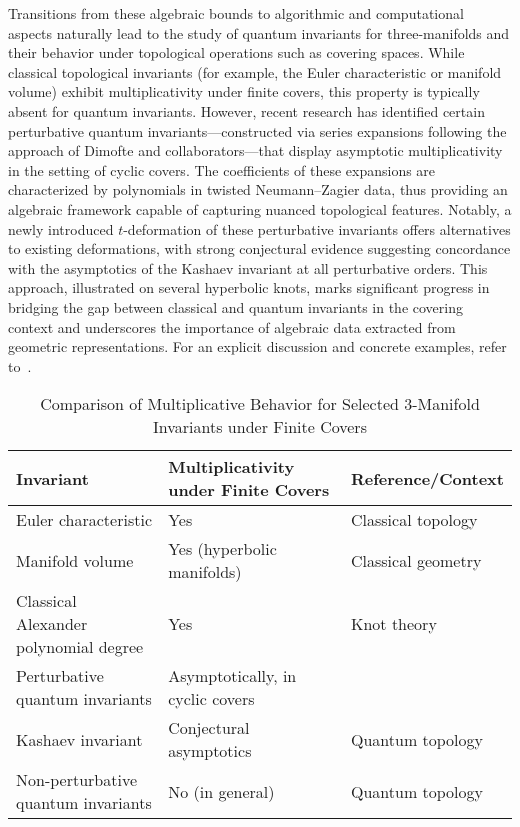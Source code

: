 \documentclass[sigconf]{acmart}
\begin{document}
Transitions from these algebraic bounds to algorithmic and computational aspects naturally lead to the study of quantum invariants for three-manifolds and their behavior under topological operations such as covering spaces. While classical topological invariants (for example, the Euler characteristic or manifold volume) exhibit multiplicativity under finite covers, this property is typically absent for quantum invariants. However, recent research has identified certain perturbative quantum invariants—constructed via series expansions following the approach of Dimofte and collaborators—that display asymptotic multiplicativity in the setting of cyclic covers. The coefficients of these expansions are characterized by polynomials in twisted Neumann–Zagier data, thus providing an algebraic framework capable of capturing nuanced topological features. Notably, a newly introduced $t$-deformation of these perturbative invariants offers alternatives to existing deformations, with strong conjectural evidence suggesting concordance with the asymptotics of the Kashaev invariant at all perturbative orders. This approach, illustrated on several hyperbolic knots, marks significant progress in bridging the gap between classical and quantum invariants in the covering context and underscores the importance of algebraic data extracted from geometric representations. For an explicit discussion and concrete examples, refer to~\cite{ref89}.

\begin{table*}[htbp]
\centering
\caption{Comparison of Multiplicative Behavior for Selected 3-Manifold Invariants under Finite Covers}
\label{tab:covering_invariants}
\begin{adjustbox}{max width=\textwidth}
\begin{tabular}{lll}
\toprule
\textbf{Invariant} & \textbf{Multiplicativity under Finite Covers} & \textbf{Reference/Context} \\
\midrule
Euler characteristic & Yes & Classical topology \\
Manifold volume & Yes (hyperbolic manifolds) & Classical geometry \\
Classical Alexander polynomial degree & Yes & Knot theory \\
Perturbative quantum invariants & Asymptotically, in cyclic covers & \cite{ref89} \\
Kashaev invariant & Conjectural asymptotics & Quantum topology \\
Non-perturbative quantum invariants & No (in general) & Quantum topology \\
\bottomrule
\end{tabular}
\end{adjustbox}
\end{table*}
\end{document}
